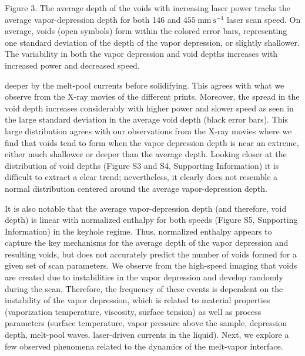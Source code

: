 \documentclass[10pt]{article}
\begin{document}
Figure 3. The average depth of the voids with increasing laser power tracks the average vapor-depression depth for both 146 and $455 \mathrm{~mm} \mathrm{~s}^{-1}$ laser scan speed. On average, voids (open symbols) form within the colored error bars, representing one standard deviation of the depth of the vapor depression, or slightly shallower. The variability in both the vapor depression and void depths increases with increased power and decreased speed.

deeper by the melt-pool currents before solidifying. This agrees with what we observe from the X-ray movies of the different prints. Moreover, the spread in the void depth increases considerably with higher power and slower speed as seen in the large standard deviation in the average void depth (black error bars). This large distribution agrees with our observations from the X-ray movies where we find that voids tend to form when the vapor depression depth is near an extreme, either much shallower or deeper than the average depth. Looking closer at the distribution of void depths (Figure S3 and S4, Supporting Information) it is difficult to extract a clear trend; nevertheless, it clearly does not resemble a normal distribution centered around the average vapor-depression depth.

It is also notable that the average vapor-depression depth (and therefore, void depth) is linear with normalized enthalpy for both speeds (Figure S5, Supporting Information) in the keyhole regime. Thus, normalized enthalpy appears to capture the key mechanisms for the average depth of the vapor depression and resulting voids, but does not accurately predict the number of voids formed for a given set of scan parameters. We observe from the high-speed imaging that voids are created due to instabilities in the vapor depression and develop randomly during the scan. Therefore, the frequency of these events is dependent on the instability of the vapor depression, which is related to material properties (vaporization temperature, viscosity, surface tension) as well as process parameters (surface temperature, vapor pressure above the sample, depression depth, melt-pool waves, laser-driven currents in the liquid). Next, we explore a few observed phenomena related to the dynamics of the melt-vapor interface.
\end{document}
